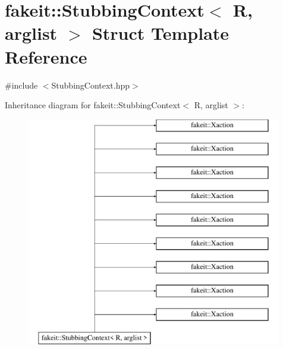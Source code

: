 \hypertarget{structfakeit_1_1StubbingContext}{}\section{fakeit\+::Stubbing\+Context$<$ R, arglist $>$ Struct Template Reference}
\label{structfakeit_1_1StubbingContext}


{\ttfamily \#include $<$Stubbing\+Context.\+hpp$>$}

Inheritance diagram for fakeit\+::Stubbing\+Context$<$ R, arglist $>$\+:\begin{figure}[H]
\begin{center}
\leavevmode
\includegraphics[height=10.000000cm]{structfakeit_1_1StubbingContext}
\end{center}
\end{figure}
